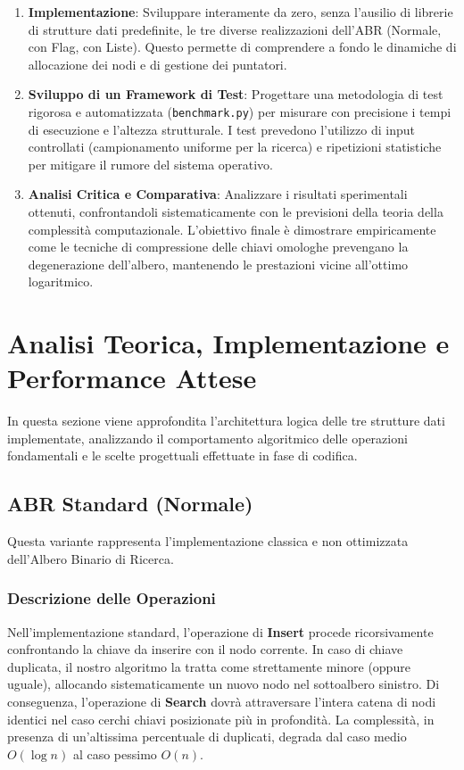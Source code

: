 \documentclass[11pt,a4paper]{article}
\begin{document}
\begin{enumerate}
    \item \textbf{Implementazione}: Sviluppare interamente da zero, senza l'ausilio di librerie di strutture dati predefinite, le tre diverse realizzazioni dell'ABR (Normale, con Flag, con Liste). Questo permette di comprendere a fondo le dinamiche di allocazione dei nodi e di gestione dei puntatori.
    \item \textbf{Sviluppo di un Framework di Test}: Progettare una metodologia di test rigorosa e automatizzata (\texttt{benchmark.py}) per misurare con precisione i tempi di esecuzione e l'altezza strutturale. I test prevedono l'utilizzo di input controllati (campionamento uniforme per la ricerca) e ripetizioni statistiche per mitigare il rumore del sistema operativo.
    \item \textbf{Analisi Critica e Comparativa}: Analizzare i risultati sperimentali ottenuti, confrontandoli sistematicamente con le previsioni della teoria della complessità computazionale. L'obiettivo finale è dimostrare empiricamente come le tecniche di compressione delle chiavi omologhe prevengano la degenerazione dell'albero, mantenendo le prestazioni vicine all'ottimo logaritmico.
\end{enumerate}

\section{Analisi Teorica, Implementazione e Performance Attese}

In questa sezione viene approfondita l'architettura logica delle tre strutture dati implementate, analizzando il comportamento algoritmico delle operazioni fondamentali e le scelte progettuali effettuate in fase di codifica.

\subsection{ABR Standard (Normale)}

Questa variante rappresenta l'implementazione classica e non ottimizzata dell'Albero Binario di Ricerca. 

\subsubsection{Descrizione delle Operazioni}
Nell'implementazione standard, l'operazione di \textbf{Insert} procede ricorsivamente confrontando la chiave da inserire con il nodo corrente. In caso di chiave duplicata, il nostro algoritmo la tratta come strettamente minore (oppure uguale), allocando sistematicamente un nuovo nodo nel sottoalbero sinistro. 
Di conseguenza, l'operazione di \textbf{Search} dovrà attraversare l'intera catena di nodi identici nel caso cerchi chiavi posizionate più in profondità. La complessità, in presenza di un'altissima percentuale di duplicati, degrada dal caso medio $O(\log n)$ al caso pessimo $O(n)$.
\end{document}
